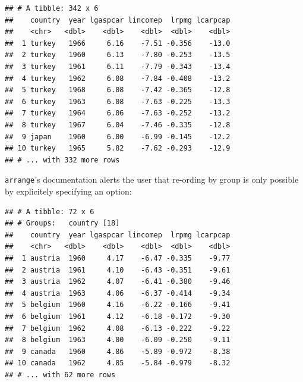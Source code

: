 \documentclass[]{gitbook}
\newenvironment{Shaded}{\begin{snugshade}}{\end{snugshade}}
\newcommand{\DataTypeTok}[1]{\textcolor[rgb]{0.13,0.29,0.53}{#1}}
\newcommand{\DecValTok}[1]{\textcolor[rgb]{0.00,0.00,0.81}{#1}}
\newcommand{\KeywordTok}[1]{\textcolor[rgb]{0.13,0.29,0.53}{\textbf{#1}}}
\newcommand{\NormalTok}[1]{#1}
\newcommand{\OperatorTok}[1]{\textcolor[rgb]{0.81,0.36,0.00}{\textbf{#1}}}
\newcommand{\OtherTok}[1]{\textcolor[rgb]{0.56,0.35,0.01}{#1}}
\newcommand{\StringTok}[1]{\textcolor[rgb]{0.31,0.60,0.02}{#1}}
\begin{document}
\begin{Shaded}
\end{Shaded}

\begin{verbatim}
## # A tibble: 342 x 6
##    country  year lgaspcar lincomep  lrpmg lcarpcap
##    <chr>   <dbl>    <dbl>    <dbl>  <dbl>    <dbl>
##  1 turkey   1966     6.16    -7.51 -0.356    -13.0
##  2 turkey   1960     6.13    -7.80 -0.253    -13.5
##  3 turkey   1961     6.11    -7.79 -0.343    -13.4
##  4 turkey   1962     6.08    -7.84 -0.408    -13.2
##  5 turkey   1968     6.08    -7.42 -0.365    -12.8
##  6 turkey   1963     6.08    -7.63 -0.225    -13.3
##  7 turkey   1964     6.06    -7.63 -0.252    -13.2
##  8 turkey   1967     6.04    -7.46 -0.335    -12.8
##  9 japan    1960     6.00    -6.99 -0.145    -12.2
## 10 turkey   1965     5.82    -7.62 -0.293    -12.9
## # ... with 332 more rows
\end{verbatim}

\texttt{arrange}'s documentation alerts the user that re-ording by group is only possible by explicitely
specifying an option:

\begin{Shaded}
\end{Shaded}

\begin{verbatim}
## # A tibble: 72 x 6
## # Groups:   country [18]
##    country  year lgaspcar lincomep  lrpmg lcarpcap
##    <chr>   <dbl>    <dbl>    <dbl>  <dbl>    <dbl>
##  1 austria  1960     4.17    -6.47 -0.335    -9.77
##  2 austria  1961     4.10    -6.43 -0.351    -9.61
##  3 austria  1962     4.07    -6.41 -0.380    -9.46
##  4 austria  1963     4.06    -6.37 -0.414    -9.34
##  5 belgium  1960     4.16    -6.22 -0.166    -9.41
##  6 belgium  1961     4.12    -6.18 -0.172    -9.30
##  7 belgium  1962     4.08    -6.13 -0.222    -9.22
##  8 belgium  1963     4.00    -6.09 -0.250    -9.11
##  9 canada   1960     4.86    -5.89 -0.972    -8.38
## 10 canada   1962     4.85    -5.84 -0.979    -8.32
## # ... with 62 more rows
\end{verbatim}
\end{document}
